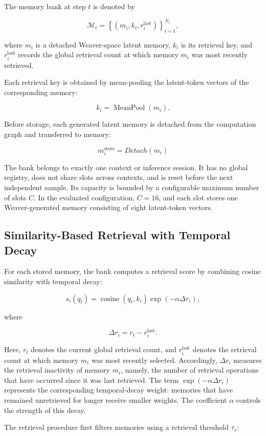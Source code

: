 The memory bank at step $t$ is denoted by

\[
\mathcal{M}_t =
\left\{
\left(m_i,k_i,r_i^{\mathrm{last}}\right)
\right\}_{i=1}^{N_t},
\]

where $m_i$ is a detached Weaver-space latent memory, $k_i$ is its retrieval key, and $r_i^{\mathrm{last}}$ records the global retrieval count at which memory $m_i$ was most recently retrieved.

Each retrieval key is obtained by mean-pooling the latent-token vectors of the corresponding memory:

\[
k_i = \operatorname{MeanPool}(m_i).
\]

Before storage, each generated latent memory is detached from the computation graph and transferred to memory:

\[
m_i^{\mathrm{store}} =
{Detach}(m_i)
\]

The bank belongs to exactly one context or inference session. It has no global registry, does not share slots across contexts, and is reset before the next independent sample. Its capacity is bounded by a configurable maximum number of slots $C$. In the evaluated configuration, $C=16$, and each slot stores one Weaver-generated memory consisting of eight latent-token vectors.

\subsection{Similarity-Based Retrieval with Temporal Decay}

For each stored memory, the bank computes a retrieval score by combining cosine similarity with temporal decay:

\[
s_i(q_t) =
\operatorname{cosine}(q_t,k_i)
\exp\left(-\alpha \Delta r_i\right),
\]

where

\[
\Delta r_i =
r_t-r_i^{\mathrm{last}}.
\]

Here, $r_t$ denotes the current global retrieval count, and $r_i^{\mathrm{last}}$ denotes the retrieval count at which memory $m_i$ was most recently selected. Accordingly, $\Delta r_i$ measures the retrieval inactivity of memory $m_i$, namely, the number of retrieval operations that have occurred since it was last retrieved. The term $\exp(-\alpha \Delta r_i)$ represents the corresponding temporal-decay weight: memories that have remained unretrieved for longer receive smaller weights. The coefficient $\alpha$ controls the strength of this decay.

The retrieval procedure first filters memories using a retrieval threshold $\tau_r$:

